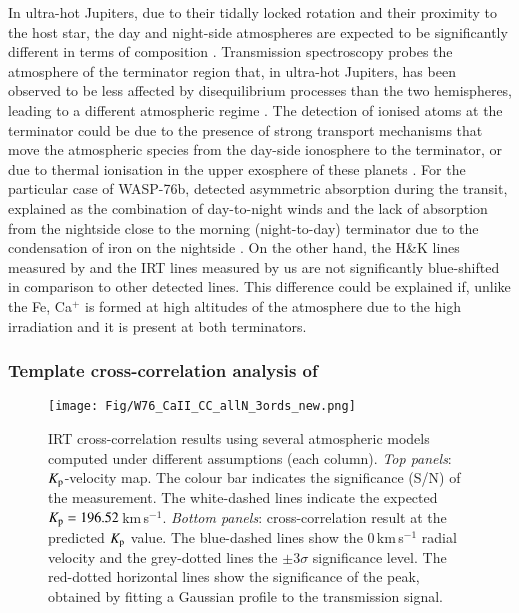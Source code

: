 \documentclass{aa}
\begin{document}
 In ultra-hot Jupiters, due to their tidally locked rotation and their proximity to the host star, the day and night-side atmospheres are expected to be significantly different in terms of composition \citep{Helling2019,Helling2021b,Helling2021a}. Transmission spectroscopy probes the atmosphere of the terminator region that, in ultra-hot Jupiters, has been observed to be less affected by disequilibrium processes than the two hemispheres, leading to a different atmospheric regime \citep{Molaverdikhani2020}. The detection of ionised atoms at the terminator could be due to the presence of strong transport mechanisms that move the atmospheric species from the day-side ionosphere to the terminator, or due to thermal ionisation in the upper exosphere of these planets \citep{Yan2019}. For the particular case of WASP-76b, \citet{Ehrenreich2020} detected asymmetric  absorption during the transit, explained as the combination of day-to-night winds and the lack of absorption from the nightside close to the morning (night-to-day) terminator due to the condensation of iron on the nightside \citep{Wardenier2021}. On the other hand, the  H\&K lines measured by \citet{Tabernero2020} and the  IRT lines measured by us are not significantly blue-shifted in comparison to other detected lines. This difference could be explained if, unlike the Fe, Ca$^+$ is formed at high altitudes of the atmosphere due to the high irradiation and it is present at both terminators.


\subsubsection{Template cross-correlation analysis of }

\begin{figure*}[]
\centering
\texttt{[image: Fig/W76\_CaII\_CC\_allN\_3ords\_new.png]}
\caption{ IRT cross-correlation results using several atmospheric models computed under different assumptions (each column).
{\em Top panels}: $K_{\rm p}$-velocity map. The colour bar indicates the significance (S/N) of the measurement. The white-dashed lines indicate the expected $K_{\rm p} = 196.52$\,km\,s$^{-1}$. 
{\em Bottom panels}: cross-correlation result at the predicted $K_{\rm p}$ value. The blue-dashed lines show the 0\,km\,s$^{-1}$ radial velocity and the grey-dotted lines the $\pm3\sigma$ significance level. The red-dotted horizontal lines show the significance of the peak, obtained by fitting a Gaussian profile to the transmission signal.}
\label{fig:CC_CaIRT}
\end{figure*}
\end{document}
